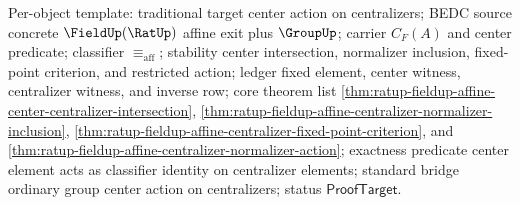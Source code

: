 Per-object template: traditional target center action on centralizers; BEDC
source concrete $\FieldUp(\RatUp)$ affine exit plus $\GroupUp$; carrier
$C_F(A)$ and center predicate; classifier $\equiv_{\mathrm{aff}}$; stability
center intersection, normalizer inclusion, fixed-point criterion, and restricted
action; ledger fixed element, center witness, centralizer witness, and inverse
row; core theorem list
\autoref{thm:ratup-fieldup-affine-center-centralizer-intersection},
\autoref{thm:ratup-fieldup-affine-centralizer-normalizer-inclusion},
\autoref{thm:ratup-fieldup-affine-centralizer-fixed-point-criterion}, and
\autoref{thm:ratup-fieldup-affine-centralizer-normalizer-action}; exactness
predicate center element acts as classifier identity on centralizer elements;
standard bridge ordinary group center action on centralizers; status
$\mathsf{ProofTarget}$.

